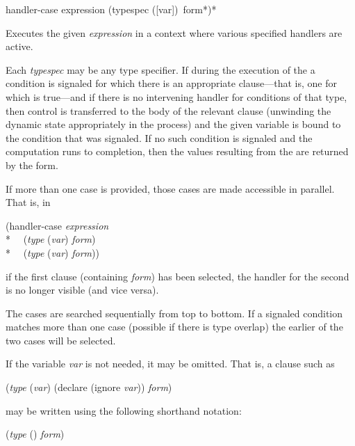 \begin{defmac}
handler-case expression {(typespec ([var]) {\,form}*)}*

  Executes the given \emph{expression} in a context where various specified handlers are active.

  Each \emph{typespec} may be any type specifier. If during the execution of the 
  a condition is signaled for which there is an appropriate clause---that is, one
  for which  is true---and if there is no intervening
  handler for conditions of that type, then control is transferred to the body
  of the relevant clause (unwinding the dynamic state appropriately in the
  process) and the given variable  is bound to the condition that was signaled. If
  no such condition is signaled and the computation runs to completion, then
  the values resulting from the  are returned by the  form.

  If more than one case is provided, those cases are made accessible in
  parallel. That is, in
\begin{lisp}
(handler-case \emph{expression} \\*
~~(\emph{type} (\emph{var}) \emph{form}) \\*
~~(\emph{type} (\emph{var}) \emph{form}))
\end{lisp}
  if the first clause (containing \emph{form}) has been selected, the handler
  for the second is no longer visible (and vice versa).

  The cases are searched sequentially from top to bottom. If a signaled condition
  matches more than one case (possible if there is type
  overlap) the earlier of the two cases will be selected.



  If the variable \emph{var} is not needed, it may be omitted. That is, a clause such as
\begin{lisp}
(\emph{type} (\emph{var}) (declare (ignore \emph{var})) \emph{form})
\end{lisp}
may be written using the following shorthand notation:
\begin{lisp}
(\emph{type} () \emph{form})
\end{lisp}


\end{defmac}
